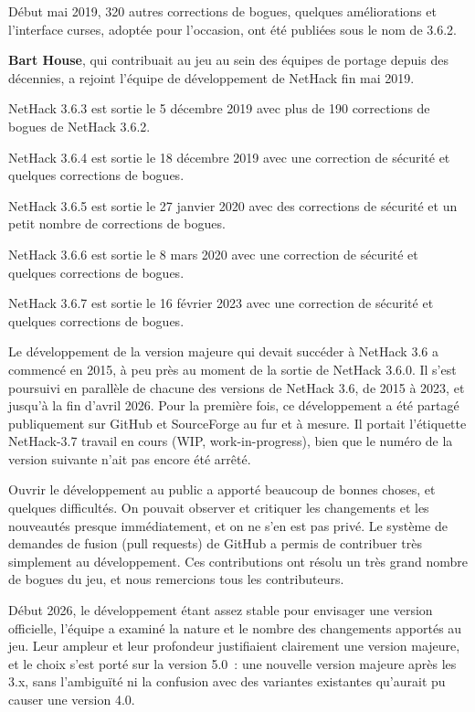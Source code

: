 \documentclass[titlepage]{article}
\begin{document}
Début mai 2019, 320 autres corrections de bogues, quelques améliorations et
l'interface curses, adoptée pour l'occasion, ont été publiées sous le nom
de 3.6.2.


\textbf{Bart House}, qui contribuait au jeu au sein des équipes de portage
depuis des décennies, a rejoint l'équipe de développement de NetHack fin
mai 2019.


NetHack 3.6.3 est sortie le 5 décembre 2019 avec plus de 190 corrections
de bogues de NetHack 3.6.2.


NetHack 3.6.4 est sortie le 18 décembre 2019 avec une correction de
sécurité et quelques corrections de bogues.


NetHack 3.6.5 est sortie le 27 janvier 2020 avec des corrections de
sécurité et un petit nombre de corrections de bogues.


NetHack 3.6.6 est sortie le 8 mars 2020 avec une correction de sécurité et
quelques corrections de bogues.


NetHack 3.6.7 est sortie le 16 février 2023 avec une correction de
sécurité et quelques corrections de bogues.


Le développement de la version majeure qui devait succéder à NetHack 3.6 a
commencé en 2015, à peu près au moment de la sortie de NetHack 3.6.0.
Il s'est poursuivi en parallèle de chacune des versions de NetHack 3.6, de
2015 à 2023, et jusqu'à la fin d'avril 2026.
Pour la première fois, ce développement a été partagé publiquement sur
GitHub et SourceForge au fur et à mesure.
Il portait l'étiquette NetHack-3.7 travail en cours (WIP, work-in-progress),
bien que le numéro de la version suivante n'ait pas encore été arrêté.


Ouvrir le développement au public a apporté beaucoup de bonnes choses, et
quelques difficultés.
On pouvait observer et critiquer les changements et les nouveautés presque
immédiatement, et on ne s'en est pas privé.
Le système de demandes de fusion (pull requests) de GitHub a permis de
contribuer très simplement au développement.
Ces contributions ont résolu un très grand nombre de bogues du jeu, et
nous remercions tous les contributeurs.


Début 2026, le développement étant assez stable pour envisager une version
officielle, l'équipe a examiné la nature et le nombre des changements
apportés au jeu.
Leur ampleur et leur profondeur justifiaient clairement une version
majeure, et le choix s'est porté sur la version 5.0~: une nouvelle version
majeure après les 3.x, sans l'ambiguïté ni la confusion avec des variantes
existantes qu'aurait pu causer une version 4.0.
\end{document}
